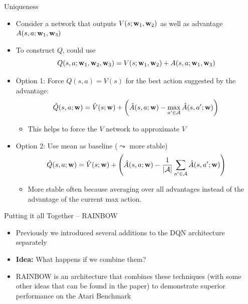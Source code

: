 \documentclass[aspectratio=169]{../latex_main/tntbeamer}  %
\begin{document}
\begin{frame}[c]{Uniqueness}
	
	\begin{itemize}
		\item Consider a network that outputs $V(s;\mathbf{w}_1, \mathbf{w}_2)$ as well as advantage $A(s,a; \mathbf{w}_1, \mathbf{w}_3)$
		\item To construct $Q$, could use $$Q(s,a;\mathbf{w}_1, \mathbf{w}_2, \mathbf{w}_3) = V(s;\mathbf{w}_1, \mathbf{w}_2) + A(s,a;\mathbf{w}_1, \mathbf{w}_3)$$
		\item Option 1: Force $Q(s,a) = V(s)$ for the best action suggested by the advantage:\\
		$$\hat{Q}(s,a;\mathbf{w}) = \hat{V}(s;\mathbf{w}) + \left( \hat{A}(s,a;\mathbf{w}) - \max_{a' \in \mathcal{A}} \hat{A}(s,a';\mathbf{w}) \right) $$
		\vspace{-1em}
		\begin{itemize}
			\item This helps to force the $V$ network to approximate $V$
		\end{itemize}
		\item Option 2: Use mean as baseline ($\leadsto$ more stable)\\
		$$\hat{Q}(s,a;\mathbf{w}) = \hat{V}(s;\mathbf{w}) + \left( \hat{A}(s,a;\mathbf{w}) - \frac{1}{|\mathcal{A}|} \sum_{a' \in \mathcal{A}} \hat{A}(s,a';\mathbf{w}) \right) $$
		\vspace{-1em}
		\begin{itemize}
			\item More stable often because averaging over all advantages instead of
			the advantage of the current max action.
		\end{itemize}
	\end{itemize}
	
\end{frame}

\begin{frame}[c]{Putting it all Together -- RAINBOW ~}
	
	\begin{itemize}
		\item Previously we introduced several additions to the DQN architecture separately
        \item \textbf{Idea:} What happens if we combine them? 
        \item RAINBOW is an architecture that combines these techniques (with some other ideas that can be found in the paper) to demonstrate superior performance on the Atari Benchmark 
	\end{itemize}
	
\end{frame}
\end{document}
